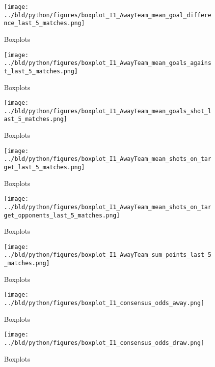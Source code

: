 \documentclass[11pt, a4paper, leqno]{article}
\begin{document}
\begin{figure}[H]
    \centering
    \texttt{[image: ../bld/python/figures/boxplot\_I1\_AwayTeam\_mean\_goal\_difference\_last\_5\_matches.png]}
    \caption{Boxplots}
    \label{fig:figure2}
\end{figure}

\begin{figure}[H]
    \centering
    \texttt{[image: ../bld/python/figures/boxplot\_I1\_AwayTeam\_mean\_goals\_against\_last\_5\_matches.png]}
    \caption{Boxplots}
    \label{fig:figure2}
\end{figure}

\begin{figure}[H]
    \centering
    \texttt{[image: ../bld/python/figures/boxplot\_I1\_AwayTeam\_mean\_goals\_shot\_last\_5\_matches.png]}
    \caption{Boxplots}
    \label{fig:figure2}
\end{figure}

\begin{figure}[H]
    \centering
    \texttt{[image: ../bld/python/figures/boxplot\_I1\_AwayTeam\_mean\_shots\_on\_target\_last\_5\_matches.png]}
    \caption{Boxplots}
    \label{fig:figure2}
\end{figure}

\begin{figure}[H]
    \centering
    \texttt{[image: ../bld/python/figures/boxplot\_I1\_AwayTeam\_mean\_shots\_on\_target\_opponents\_last\_5\_matches.png]}
    \caption{Boxplots}
    \label{fig:figure2}
\end{figure}

\begin{figure}[H]
    \centering
    \texttt{[image: ../bld/python/figures/boxplot\_I1\_AwayTeam\_sum\_points\_last\_5\_matches.png]}
    \caption{Boxplots}
    \label{fig:figure2}
\end{figure}

\begin{figure}[H]
    \centering
    \texttt{[image: ../bld/python/figures/boxplot\_I1\_consensus\_odds\_away.png]}
    \caption{Boxplots}
    \label{fig:figure2}
\end{figure}

\begin{figure}[H]
    \centering
    \texttt{[image: ../bld/python/figures/boxplot\_I1\_consensus\_odds\_draw.png]}
    \caption{Boxplots}
    \label{fig:figure2}
\end{figure}
\end{document}
